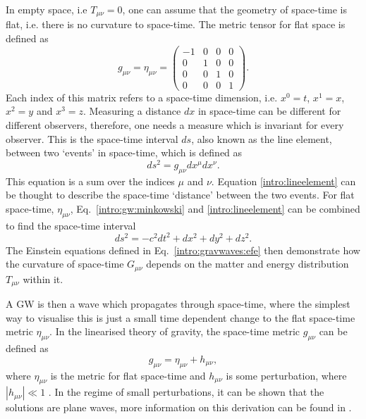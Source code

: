 In empty space, i.e $T_{\mu \nu} = 0$, one can assume that the geometry of space-time is flat, i.e. there is no curvature to space-time. The metric tensor for flat space is defined as
\begin{equation}
    \label{intro:gw:minkowski}
g_{\mu \nu} = \eta_{\mu \nu} = \left(
\begin{matrix}
-1 & 0 & 0 & 0 \\
0 & 1 & 0 & 0 \\
0 & 0 & 1 & 0 \\
0 & 0 & 0 & 1 
\end{matrix}
\right).
\end{equation}
Each index of this matrix refers to a space-time dimension, i.e. $x^0 = t$,
$x^1=x$, $x^2=y$ and $x^3=z$.  Measuring a distance $dx$ in space-time can be
different for different observers, therefore, one needs a measure which is
invariant for every observer.  This is the space-time interval $ds$, also known
as the line element, between two `events' in space-time, which is defined as
\begin{equation}
\label{intro:lineelement}
    ds^2 = g_{\mu \nu} dx^{\mu}dx^{\nu}.
\end{equation}
This equation is a sum over the indices $\mu$ and
$\nu$.  
Equation \ref{intro:lineelement} can be
thought to describe the space-time `distance' between the two events.  For flat
space-time, $\eta_{\mu\nu}$, Eq.~\ref{intro:gw:minkowski} and \ref{intro:lineelement} can be combined to find the space-time interval
%
\begin{equation}
    ds^2 = -c^2 dt^2 + dx^2 + dy^2 + dz^2.
\end{equation}
%
The Einstein equations defined in Eq.~\ref{intro:gravwaves:efe}
then demonstrate how the curvature of space-time $G_{\mu\nu}$ depends on the
matter and energy distribution $T_{\mu \nu}$ within it.~

A \gls{GW} is then a wave which propagates through space-time, where the simplest way to
visualise this is just a small time dependent change to the flat space-time
metric $\eta_{\mu\nu}$.  In the linearised theory of gravity, the
space-time metric $g_{\mu \nu}$ can be defined as
\begin{equation}
\label{intro:gravwave:metric}
    g_{\mu \nu} = \eta_{\mu \nu} + h_{\mu \nu},
\end{equation}
where $ \eta_{\mu \nu}$ is the metric for flat space-time and $h_{\mu \nu}$ is
some perturbation, where $|h_{\mu \nu}| \ll 1$
\citep{flanagan2005BasicsGravitational}. In the regime of small perturbations, it can be shown that the solutions are plane waves,
more information on this derivation can be found in
\citep{flanagan2005BasicsGravitational,letiec2016TheoryGravitational}.  

